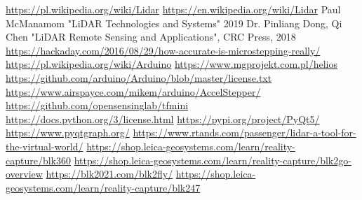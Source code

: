 \documentclass{thesis}
\begin{document}

\newpage
\tableofcontents
\newpage









\begin{thebibliography}{10}
 \url{https://pl.wikipedia.org/wiki/Lidar}
 \url{https://en.wikipedia.org/wiki/Lidar}
 Paul McManamom "LiDAR Technologies and Systems" 2019
 Dr. Pinliang Dong, Qi Chen "LiDAR Remote Sensing and Applications", CRC Press, 2018
 \url{https://hackaday.com/2016/08/29/how-accurate-is-microstepping-really/}
 \url{https://pl.wikipedia.org/wiki/Arduino}
 \url{https://www.mgprojekt.com.pl/helios}
 \url{https://github.com/arduino/Arduino/blob/master/license.txt}
 \url{https://www.airspayce.com/mikem/arduino/AccelStepper/}
 \url{https://github.com/opensensinglab/tfmini}
 \url{https://docs.python.org/3/license.html}
 \url{https://pypi.org/project/PyQt5/}
 \url{https://www.pyqtgraph.org/}
 \url{https://www.rtands.com/passenger/lidar-a-tool-for-the-virtual-world/}
 \url{https://shop.leica-geosystems.com/learn/reality-capture/blk360}
 \url{https://shop.leica-geosystems.com/learn/reality-capture/blk2go-overview}
 \url{https://blk2021.com/blk2fly/}
 \url{https://shop.leica-geosystems.com/learn/reality-capture/blk247}

\end{thebibliography}
\newpage
\listoffigures
\end{document}
